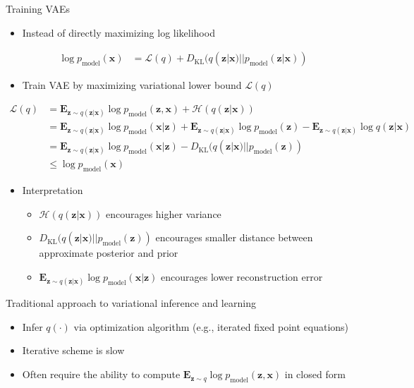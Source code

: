 \documentclass[dvipdfmx,presentation]{beamer}
\def\bf{\mathbf}
\begin{document}
\begin{frame}[label={sec:orgheadline21}]{Training VAEs}
\begin{itemize}
\item Instead of directly maximizing log likelihood
\end{itemize}
\begin{align*}
\log p_{\mathrm{model}} (\bf{x}) &= \mathcal{L}(q) + D_{\mathrm{KL}}(q(\bf{z} | \bf{x}) || p_{\mathrm{model}}(\bf{z} | \bf{x}))
\end{align*}

\begin{itemize}
\item Train VAE by maximizing variational lower bound \(\mathcal{L}(q)\)
\end{itemize}
\begin{align*}
\mathcal{L}(q) 
&= 
\bf{E}_{\bf{z} \sim q(\bf{z} | \bf{x})} \log p_{\mathrm{model}}(\bf{z}, \bf{x}) 
+ \mathcal{H}(q(\bf{z} | \bf{x})) \tag{20.76}\\
&= \bf{E}_{\bf{z} \sim q(\bf{z} | \bf{x})} \log p_{\mathrm{model}}(\bf{x} | \bf{z})
+ \bf{E}_{\bf{z} \sim q(\bf{z} | \bf{x})} \log p_{\mathrm{model}}(\bf{z})
- \bf{E}_{\bf{z} \sim q(\bf{z} | \bf{x})} \log q(\bf{z} | \bf{x}) \\
&= 
\bf{E}_{\bf{z} \sim q(\bf{z} | \bf{x})} \log p_{\mathrm{model}}(\bf{x} | \bf{z})
- D_{\mathrm{KL}}( q(\bf{z} | \bf{x}) || p_{\mathrm{model}}(\bf{z})) \tag{20.77}\\
&\le \log p_{\mathrm{model}} (\bf{x}) \tag{20.78}
\end{align*}

\begin{itemize}
\item Interpretation
\begin{itemize}
\item \(\mathcal{H}(q(\bf{z} | \bf{x}))\) encourages higher variance
\item \(D_{\mathrm{KL}}( q(\bf{z} | \bf{x}) || p_{\mathrm{model}}(\bf{z}))\) encourages smaller distance between approximate posterior and prior
\item \(\bf{E}_{\bf{z} \sim q(\bf{z} | \bf{x})} \log p_{\mathrm{model}}(\bf{x} | \bf{z})\) encourages lower reconstruction error
\end{itemize}
\end{itemize}
\end{frame}

\begin{frame}[label={sec:orgheadline22}]{Traditional approach to variational inference and learning}
\begin{itemize}
\item Infer \(q(\cdot)\) via optimization algorithm (e.g., iterated fixed point equations)
\item Iterative scheme is slow
\item Often require the ability to compute \(\bf{E}_{\bf{z} \sim q} \log p_{\mathrm{model}}(\bf{z}, \bf{x})\) in closed form
\end{itemize}
\end{frame}
\end{document}

